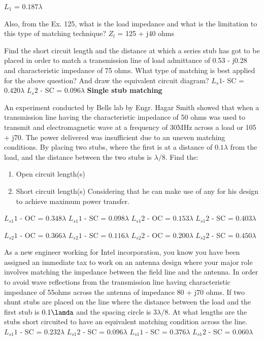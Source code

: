 \begin{mdframed}[ backgroundcolor=lightblue, linewidth=1pt, hidealllines=true]
\begin{ExerciseList}
$L_1$ = $0.187\lambda$

\Exercise[label={ex126}] 
Also, from the Ex. 125, what is the load impedance and what is the limitation to this type of matching technique?
\Answer[ref={ex126}]
$Z_l$ = 125 + j40 ohms

\Exercise[label={ex127}] 
Find the short circuit length and the distance at which a series stub has got to be placed in order to match a transmission line of load admittance of 0.53 - j0.28 and characteristic impedance of 75 ohms. What type of matching is best applied for the above question? And draw the equivalent circuit diagram?
\Answer[ref={ex128}]
$L_s1$- SC = $0.420\lambda$
$L_s2$ - SC = $0.096\lambda$
\textbf{Single stub matching}

\Exercise[label={ex129}] 
An experiment conducted by Bells lab by Engr. Hagar Smith showed that when a transmission line having the characteristic impedance of 50 ohms was used to transmit and electromagnetic wave at a frequency of 30MHz across a load or 105 + j70. The power delivered was insufficient due to an uneven matching conditions. By placing two stubs, where the first is at a distance of $0.1\lambda$ from the load, and the distance between the two stubs is $\lambda/8$.
Find the:

\begin{enumerate}
\item Open circuit length(s)
\item Short circuit length(s)
Considering that he can make use of any for his design to achieve maximum power transfer.
\end{enumerate}

\Answer[ref={ex129}]
$L_{s1}{1}$ - OC = $0.348\lambda$
$L_{s1}{1}$ - SC = $0.098\lambda$
$L_{s1}{2}$ - OC = $0.153\lambda$
$L_{s1}{2}$ - SC = $0.403\lambda$

$L_{s2}{1}$ - OC = $0.366\lambda$
$L_{s2}{1}$ - SC = $0.116\lambda$
$L_{s2}{2}$ - OC = $0.200\lambda$
$L_{s2}{2}$ - SC = $0.450\lambda$


\Exercise[label={ex130}] 
As a new engineer working for Intel incorporation, you know you have been assigned an immediate tax to work on an antenna design where your major role involves matching the impedance between the field line and the antenna. In order to avoid wave reflections from the transmission line having characteristic impedance of 55ohms across the antenna of impedance 80 + j70 ohms. If two shunt stubs are placed on the line where the distance between the load and the first stub is $0.1\lamda$ and the spacing circle is $3\lambda/8$. At what lengths are the stubs short circuited to have an equivalent matching condition across the line.
\Answer[ref={ex130}]
$L_{s1}{1}$ - SC = $0.232\lambda$
$L_{s1}{2}$ - SC = $0.096\lambda$
$L_{s1}{1}$ - SC = $0.376\lambda$
$L_{s1}{2}$ - SC = $0.060\lambda$

\end{ExerciseList}
\end{mdframed}